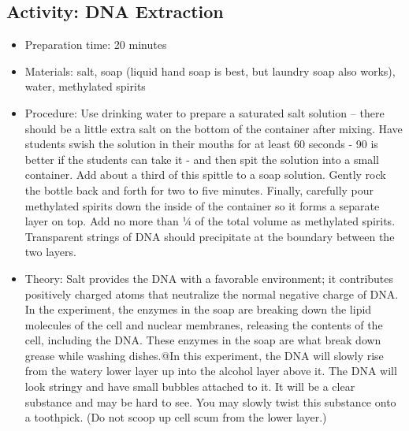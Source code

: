 \subsection{Activity: DNA Extraction}
\begin{itemize}
\item{Preparation time: 20 minutes}
\item{Materials: salt, soap (liquid hand soap is best, but laundry soap also works), water, methylated spirits}
\item{Procedure: Use drinking water to prepare a saturated salt solution – there should be a little extra salt on the bottom of the container after mixing. Have students swish the solution in their mouths for at least 60 seconds - 90 is better if the students can take it - and then spit the solution into a small container. Add about a third of this spittle to a soap solution. Gently rock the bottle back and forth for two to five minutes. Finally, carefully pour methylated spirits down the inside of the container so it forms a separate layer on top. Add no more than ¼ of the total volume as methylated spirits. Transparent strings of DNA should precipitate at the boundary between the two layers.}
\item{Theory: Salt provides the DNA with a favorable environment; it contributes positively charged atoms that neutralize the normal negative charge of DNA. In the experiment, the enzymes in the soap are breaking down the lipid molecules of the cell and nuclear membranes, releasing the contents of the cell, including the DNA. These enzymes in the soap are what break down grease while washing dishes.@In this experiment, the DNA will slowly rise from the watery lower layer up into the alcohol layer above it. The DNA will look stringy and have small bubbles attached to it. It will be a clear substance and may be hard to see. You may slowly twist this substance onto a toothpick. (Do not scoop up cell scum from the lower layer.)}
\end{itemize}

